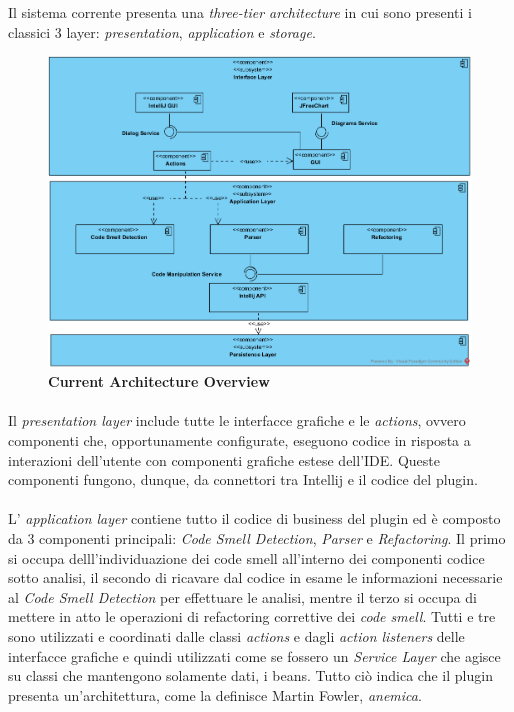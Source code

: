 Il sistema corrente presenta una \textit{three-tier architecture} in cui sono presenti i classici 3 layer: \textit{presentation}, \textit{application} e \textit{storage}. 

\begin{figure}[h!]
	\centering
	\includegraphics[scale=0.7]{./CS_Architecture/Diagrams/TACOR-Component.png} \\
	\textbf{Current Architecture Overview}
\end{figure}


\paragraph{}Il \textit{presentation layer} include tutte le interfacce grafiche e le \textit{actions}, ovvero componenti che, opportunamente configurate, eseguono codice in risposta a interazioni dell'utente con componenti grafiche estese dell'IDE. Queste componenti fungono, dunque, da connettori tra Intellij e il codice del plugin.

\paragraph{} L' \textit{application layer} contiene tutto il codice di business del plugin ed è composto da 3 componenti principali: \textit{Code Smell Detection}, \textit{Parser} e \textit{Refactoring}. Il primo si occupa delll'individuazione dei code smell all'interno dei componenti codice sotto analisi, il secondo di ricavare dal codice in esame le informazioni necessarie al \textit{Code Smell Detection} per effettuare le analisi, mentre il terzo si occupa di mettere in atto le operazioni di refactoring correttive dei \textit{code smell}. Tutti e tre sono utilizzati e coordinati dalle classi \textit{actions} e dagli \textit{action listeners} delle interfacce grafiche e quindi utilizzati come se fossero un \textit{Service Layer} che agisce su classi che mantengono solamente dati, i beans. Tutto ciò indica che il plugin presenta un'architettura, come la definisce Martin Fowler, \textit{anemica}.


